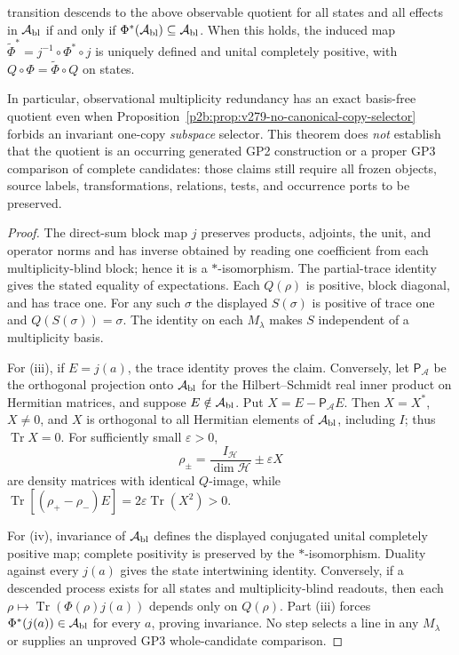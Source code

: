 \documentclass[12pt,a4paper]{article}
\begin{document}
\begin{theorem}
\begin{enumerate}[label=(\roman*),leftmargin=2em]
transition descends to the above observable quotient for all states
and all effects in $\mathcal A_{\rm bl}$ if and only if
$\Phi^*(\mathcal A_{\rm bl})\subseteq\mathcal A_{\rm bl}$. When this
holds, the induced map
$\widetilde\Phi^*=j^{-1}\circ\Phi^*\circ j$
is uniquely defined and unital completely positive, with
$Q\circ\Phi=\widetilde\Phi\circ Q$ on states.
\end{enumerate}
In particular, observational multiplicity redundancy has an exact
basis-free quotient even when
Proposition~\ref{p2b:prop:v279-no-canonical-copy-selector}
forbids an invariant one-copy \emph{subspace} selector. This theorem does
\emph{not} establish that the quotient is an occurring generated GP2
construction or a proper GP3 comparison of complete candidates: those
claims still require all frozen objects, source labels, transformations,
relations, tests, and occurrence ports to be preserved.
\end{theorem}
\begin{proof}
The direct-sum block map $j$ preserves products, adjoints, the unit,
and operator norms and has inverse obtained by reading one coefficient
from each multiplicity-blind block; hence it is a $*$-isomorphism.
The partial-trace identity gives the stated equality of expectations.
Each $Q(\rho)$ is positive, block diagonal, and has trace one. For any
such $\sigma$ the displayed $S(\sigma)$ is positive of trace one and
$Q(S(\sigma))=\sigma$. The identity on each $M_\lambda$ makes $S$
independent of a multiplicity basis.

For (iii), if $E=j(a)$, the trace identity proves the claim. Conversely,
let $\mathsf P_{\mathcal A}$ be the orthogonal projection onto
$\mathcal A_{\rm bl}$ for the Hilbert--Schmidt real inner product on
Hermitian matrices, and suppose $E\notin\mathcal A_{\rm bl}$. Put
$X=E-\mathsf P_{\mathcal A}E$. Then $X=X^*$, $X\ne0$, and $X$ is
orthogonal to all Hermitian elements of $\mathcal A_{\rm bl}$, including
$I$; thus $\operatorname{Tr}X=0$. For sufficiently small $\varepsilon>0$,
\[
 \rho_\pm=\frac{I_\mathcal H}{\dim\mathcal H}
                 \pm\varepsilon X
\]
are density matrices with identical $Q$-image, while
$\operatorname{Tr}[(\rho_+-\rho_-)E]
=2\varepsilon\operatorname{Tr}(X^2)>0$.

For (iv), invariance of $\mathcal A_{\rm bl}$ defines the displayed
conjugated unital completely positive map; complete positivity is
preserved by the $*$-isomorphism. Duality against every $j(a)$ gives
the state intertwining identity. Conversely, if a descended process
exists for all states and multiplicity-blind readouts, then each
$\rho\mapsto\operatorname{Tr}(\Phi(\rho)j(a))$
depends only on $Q(\rho)$. Part (iii) forces
$\Phi^*(j(a))\in\mathcal A_{\rm bl}$ for every $a$, proving invariance.
No step selects a line in any $M_\lambda$ or supplies an unproved
GP3 whole-candidate comparison.
\end{proof}
\end{document}
